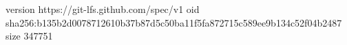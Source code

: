 version https://git-lfs.github.com/spec/v1
oid sha256:b135b2d0078712610b37b87d5c50ba11f5fa872715c589ee9b134c52f04b2487
size 347751

